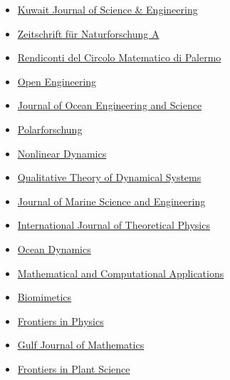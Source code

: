 \documentclass[final, a4paper, oneside, 12pt]{article}
\numberwithin{equation}{section}
\begin{document}
\begin{itemize}
    \item \href{http://pubcouncil.kuniv.edu.kw/kjs/}{Kuwait Journal of Science \& Engineering}
    
    \item \href{http://www.degruyter.com/view/j/zna}{Zeitschrift f\"ur Naturforschung A}
    
    \item \href{http://www.springer.com/mathematics/journal/12215}{Rendiconti del Circolo Matematico di Palermo }
    
    \item \href{https://www.degruyter.com/view/j/eng}{Open Engineering}

    \item \href{https://www.sciencedirect.com/journal/journal-of-ocean-engineering-and-science/}{Journal of Ocean Engineering and Science}
    
    \item \href{http://www.polarforschung.de/}{Polarforschung}
    
    \item \href{https://link.springer.com/journal/11071}{Nonlinear Dynamics}

    \item \href{https://link.springer.com/journal/12346}{Qualitative Theory of Dynamical Systems}

    \item \href{https://www.mdpi.com/journal/jmse/}{Journal of Marine Science and Engineering}

    \item \href{https://link.springer.com/journal/10773/}{International Journal of Theoretical Physics}

    \item \href{https://link.springer.com/journal/10236/}{Ocean Dynamics}
    
    \item \href{https://www.mdpi.com/journal/mca/}{Mathematical and Computational Applications}

    \item \href{https://www.mdpi.com/journal/biomimetics/}{Biomimetics}

    \item \href{https://www.frontiersin.org/journals/physics/}{Frontiers in Physics}

    \item \href{https://gjom.org/}{Gulf Journal of Mathematics}

    \item \href{https://www.frontiersin.org/journals/plant-science/}{
Frontiers in Plant Science}


\end{itemize}
\end{document}
